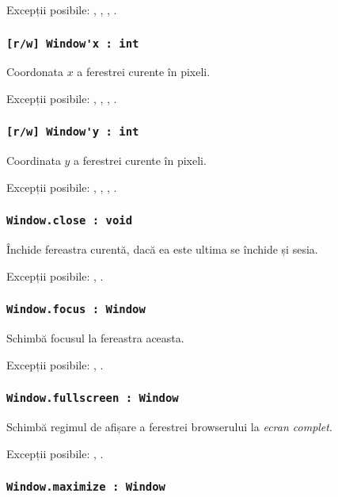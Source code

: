 Excepții posibile: , , , .

\subsubsection{\lstinline|[r/w] Window'x : int|}

Coordonata $x$ a ferestrei curente în pixeli.

Excepții posibile: , , , .

\subsubsection{\lstinline|[r/w] Window'y : int|}

Coordinata $y$ a ferestrei curente în pixeli.

Excepții posibile: , , , .

\subsubsection{\lstinline|Window.close : void|}

Închide fereastra curentă, dacă ea este ultima se închide și sesia.

Excepții posibile: , .

\subsubsection{\lstinline|Window.focus : Window|}

Schimbă focusul la fereastra aceasta.

Excepții posibile: , .

\subsubsection{\lstinline|Window.fullscreen : Window|}

Schimbă regimul de afișare a ferestrei browserului la \textit{ecran complet}.

Excepții posibile: , .

\subsubsection{\lstinline|Window.maximize : Window|}

